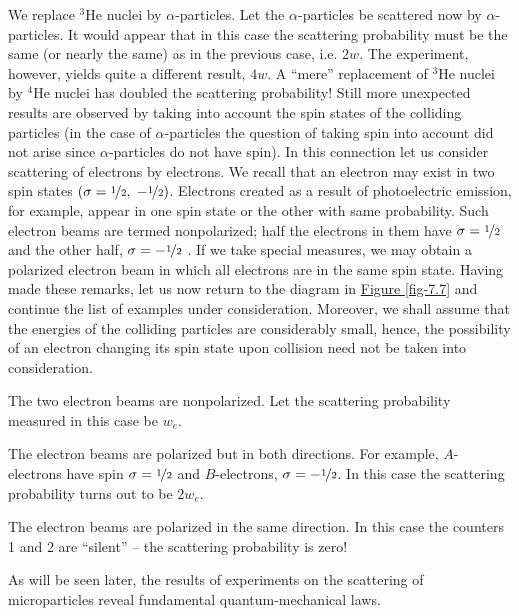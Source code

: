 \documentclass[a4paper,sfsidenotes,colorlinks=true]{tufte-book}
\numberwithin{equation}{section}
\numberwithin{figure}{section}
\begin{document}
\begin{description}[font=\bfseries, leftmargin=1cm]
\item[Third example.] We replace $^{3}$He nuclei by
  $\alpha$-particles. Let the $\alpha$-particles be scattered now by
  $\alpha$-particles. It would appear that in this case the scattering
  probability must be the same (or nearly the same) as in the previous
  case, i.e. $2w$. The experiment, however, yields quite a different
  result, $4w$. A ``mere'' replacement of $^{3}$He nuclei by $^{4}$He
  nuclei has doubled the scattering probability! Still more unexpected
  results are observed by taking into account the spin states of the
  colliding particles (in the case of $\alpha$-particles the question
  of taking spin into account did not arise since $\alpha$-particles
  do not have spin). In this connection let us consider scattering of
  electrons by electrons. We recall that an electron may exist in two
  spin states $ \left( \sigma = \nicefrac{1}{2}, \; -\nicefrac{1}{2}
  \right) $. Electrons created as a result of photoelectric emission,
  for example, appear in one spin state or the other with same
  probability. Such electron beams are termed nonpolarized; half the
  electrons in them have $\sigma = \nicefrac{1}{2}$ and the other
  half, $\sigma = - \nicefrac{1}{2}$ . If we take special measures, we
  may obtain a polarized electron beam in which all electrons are in
  the same spin state. Having made these remarks, let us now return to
  the diagram in \hyperref[fig-7.7]{Figure \ref{fig-7.7}} and continue
  the list of examples under consideration. Moreover, we shall assume
  that the energies of the colliding particles are considerably small,
  hence, the possibility of an electron changing its spin state upon
  collision need not be taken into consideration.


\item[Fourth example.] The two electron beams are nonpolarized. Let the scattering probability measured in this case be $w_{e}$. 


\item[Fifth example.] The electron beams are polarized but in both
  directions. For example, $A$-electrons have spin $\sigma =
  \nicefrac{1}{2}$ and $B$-electrons, $\sigma = - \nicefrac{1}{2}$. In
  this case the scattering probability turns out to be $2w_{e}$.


\item[Sixth example.] The electron beams are polarized in the same
  direction. In this case the counters \textsf{1} and \textsf{2} are
  ``silent'' -- the scattering probability is zero! 
\end{description}
As will be seen later, the results of experiments on the scattering of microparticles reveal fundamental quantum-mechanical laws.
\end{document}
